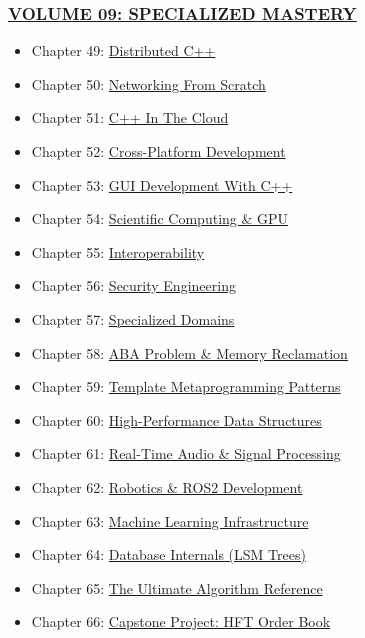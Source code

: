 \hypertarget{volume-09-specialized-mastery}{%
\subsubsection{\texorpdfstring{\protect\hyperlink{volume-09-specialized-mastery}{VOLUME
09: SPECIALIZED
MASTERY}}{VOLUME 09: SPECIALIZED MASTERY}}\label{volume-09-specialized-mastery}}

\begin{itemize}
\tightlist
\item
  Chapter 49: \protect\hyperlink{chapter-49-distributed-c}{Distributed
  C++}
\item
  Chapter 50:
  \protect\hyperlink{chapter-50-networking-from-scratch}{Networking From
  Scratch}
\item
  Chapter 51: \protect\hyperlink{chapter-51-c-in-the-cloud}{C++ In The
  Cloud}
\item
  Chapter 52:
  \protect\hyperlink{chapter-52-cross-platform-development}{Cross-Platform
  Development}
\item
  Chapter 53: \protect\hyperlink{chapter-53-gui-development-with-c}{GUI
  Development With C++}
\item
  Chapter 54:
  \protect\hyperlink{chapter-54-scientific-computing-gpu}{Scientific
  Computing \& GPU}
\item
  Chapter 55:
  \protect\hyperlink{chapter-55-interoperability}{Interoperability}
\item
  Chapter 56:
  \protect\hyperlink{chapter-56-security-engineering}{Security
  Engineering}
\item
  Chapter 57:
  \protect\hyperlink{chapter-57-specialized-domains}{Specialized
  Domains}
\item
  Chapter 58:
  \protect\hyperlink{chapter-58-aba-problem-memory-reclamation}{ABA
  Problem \& Memory Reclamation}
\item
  Chapter 59:
  \protect\hyperlink{chapter-59-template-metaprogramming-patterns}{Template
  Metaprogramming Patterns}
\item
  Chapter 60:
  \protect\hyperlink{chapter-60-high-performance-data-structures}{High-Performance
  Data Structures}
\item
  Chapter 61:
  \protect\hyperlink{chapter-61-real-time-audio-signal-processing}{Real-Time
  Audio \& Signal Processing}
\item
  Chapter 62:
  \protect\hyperlink{chapter-62-robotics-ros2-development}{Robotics \&
  ROS2 Development}
\item
  Chapter 63:
  \protect\hyperlink{chapter-63-machine-learning-infrastructure}{Machine
  Learning Infrastructure}
\item
  Chapter 64:
  \protect\hyperlink{chapter-64-database-internals-lsm-trees}{Database
  Internals (LSM Trees)}
\item
  Chapter 65:
  \protect\hyperlink{chapter-65-the-ultimate-algorithm-reference}{The
  Ultimate Algorithm Reference}
\item
  Chapter 66:
  \protect\hyperlink{chapter-66-capstone-project---high-performance-order-book}{Capstone
  Project: HFT Order Book}
\end{itemize}

